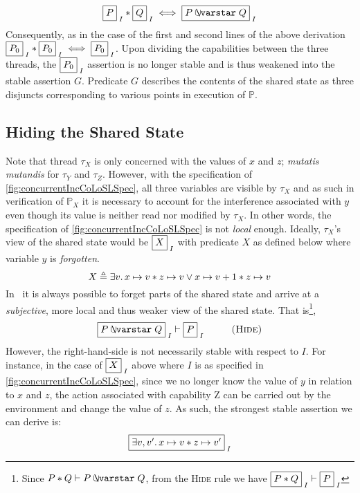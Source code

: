 %
\[
	\shared{P}{I} * \shared{Q}{I} \iff \shared{P \sepish Q}{I}
\]
%
Consequently, as in the case of the first and second lines of the above derivation $\shared{P_0}{I} * \shared{P_0}{I} \iff \shared{P_0}{I}$. Upon dividing the capabilities between the three threads, the $\shared{P_0}{I}$ assertion is no longer stable and is thus weakened into the stable assertion $G$. Predicate $G$ describes the contents of the shared state as three disjuncts corresponding to various points in execution of $\mathbb{P}$. 
%
%
%
\subsection{Hiding the Shared State}\label{subsec:hide}
Note that thread $\tau_X$ is only concerned with the values of $x$ and $z$; \emph{mutatis mutandis} for $\tau_Y$ and $\tau_Z$. However, with the specification of \fig\ref{fig:concurrentIncCoLoSLSpec}, all three variables are visible by $\tau_X$ and as such in verification of $\mathbb{P}_X$ it is necessary to account for the interference associated with $y$ even though its value is neither read nor modified by $\tau_X$. In other words, the specification of \fig\ref{fig:concurrentIncCoLoSLSpec} is not \emph{local} enough. Ideally, $\tau_X$'s view of the shared state would be $\shared{X}{I}$ with predicate $X$ as defined below where variable $y$ is \emph{forgotten}.
%
\[
	X \mathrel{\triangleq} \exists v.\, x \mapsto v * z \mapsto v \lor x \mapsto v+1 * z \mapsto v
\]
%
In \colosl\ it is always possible to forget parts of the shared state and arrive at a \emph{subjective}, more local and thus weaker view of the shared state. That is\footnote{Since $P * Q \vdash P \sepish Q$, from the \textsc{Hide} rule we have $\shared{P * Q}{I} \vdash \shared{P}{I}$},
%
\[
	\shared{P \sepish Q}{I} \vdash \shared{P}{I} \hspace*{1cm} \textsc{(Hide)}
\]
%
However, the right-hand-side is not necessarily stable with respect to $I$. For instance, in the case of $\shared{X}{I}$ above where $I$ is as specified in \fig\ref{fig:concurrentIncCoLoSLSpec}, since we no longer know the value of $y$ in relation to $x$ and $z$, the action associated with capability \textsf{Z} can be carried out by the environment and change the value of $z$. As such, the strongest stable assertion we can derive is: 
%
\[
	\shared{\exsts{v, v'}  \cell{x}{v} * \cell{z}{v'}}{I}
\]
%
%
